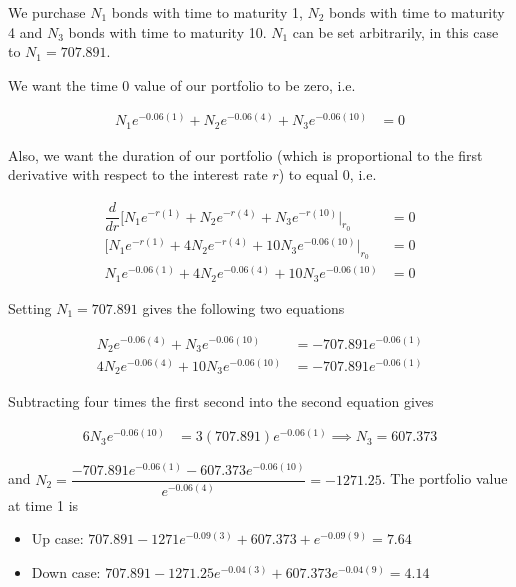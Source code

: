 \documentclass{article}
\numberwithin{questioncounter}{section}
\begin{document}
\begin{solution}
We purchase $N_{1}$ bonds with time to maturity 1, $N_{2}$ bonds with time to maturity 4 and $N_{3}$ bonds with time to maturity 10. $N_{1}$ can be set arbitrarily, in this case to $N_{1} = 707.891$.

We want the time 0 value of our portfolio to be zero, i.e.

\begin{align*}
N_{1} e^{-0.06(1)} + N_{2} e^{-0.06(4)} + N_{3} e^{-0.06(10)} &= 0
\end{align*}

Also, we want the duration of our portfolio (which is proportional to the first derivative with respect to the interest rate $r$) to equal 0, i.e.

\begin{align*}
\dfrac{d}{dr} \Big[N_{1} e^{-r(1)} + N_{2} e^{-r(4)} + N_{3} e^{-r(10)} \Big|_{r_{0}} &= 0 \\
\Big[N_{1} e^{-r(1)} + 4N_{2} e^{-r(4)} + 10N_{3} e^{-0.06(10)} \Big|_{r_{0}} &= 0 \\
N_{1} e^{-0.06(1)} + 4N_{2} e^{-0.06(4)} + 10N_{3} e^{-0.06(10)} &= 0
\end{align*}

Setting $N_{1} = 707.891$ gives the following two equations

\begin{align*}
N_{2} e^{-0.06(4)} + N_{3} e^{-0.06(10)} &= -707.891 e^{-0.06(1)} \\
4N_{2} e^{-0.06(4)} + 10N_{3} e^{-0.06(10)} &= -707.891 e^{-0.06(1)}
\end{align*}

Subtracting four times the first second into the second equation gives

\begin{align*}
6N_{3} e^{-0.06(10)} &= 3(707.891) e^{-0.06(1)} \implies N_{3} = 607.373
\end{align*}

and $N_{2} = \dfrac{-707.891 e^{-0.06(1)} - 607.373e^{-0.06(10)}}{e^{-0.06(4)}} = -1271.25$. The portfolio value at time 1 is

\medskip

\begin{itemize}
\item Up case: $707.891 - 1271 e^{-0.09(3)} + 607.373 + e^{-0.09(9)} = 7.64$
\item Down case: $707.891 - 1271.25 e^{-0.04(3)} + 607.373e^{-0.04(9)} = 4.14$
\end{itemize}

\end{solution}
\end{document}
